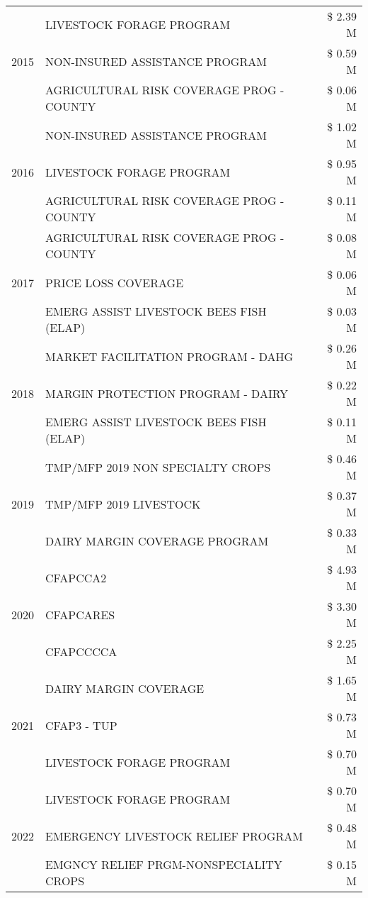 \begin{tabular}{llr}
\cline{1-3}
\multirow[t]{3}{*}{2015} & LIVESTOCK FORAGE PROGRAM & \$ 2.39 M \\
 & NON-INSURED ASSISTANCE PROGRAM & \$ 0.59 M \\
 & AGRICULTURAL RISK COVERAGE PROG - COUNTY & \$ 0.06 M \\
\cline{1-3}
\multirow[t]{3}{*}{2016} & NON-INSURED ASSISTANCE PROGRAM & \$ 1.02 M \\
 & LIVESTOCK FORAGE PROGRAM & \$ 0.95 M \\
 & AGRICULTURAL RISK COVERAGE PROG - COUNTY & \$ 0.11 M \\
\cline{1-3}
\multirow[t]{3}{*}{2017} & AGRICULTURAL RISK COVERAGE PROG - COUNTY & \$ 0.08 M \\
 & PRICE LOSS COVERAGE & \$ 0.06 M \\
 & EMERG ASSIST LIVESTOCK BEES FISH (ELAP) & \$ 0.03 M \\
\cline{1-3}
\multirow[t]{3}{*}{2018} & MARKET FACILITATION PROGRAM - DAHG & \$ 0.26 M \\
 & MARGIN PROTECTION PROGRAM - DAIRY & \$ 0.22 M \\
 & EMERG ASSIST LIVESTOCK BEES FISH (ELAP) & \$ 0.11 M \\
\cline{1-3}
\multirow[t]{3}{*}{2019} & TMP/MFP 2019 NON SPECIALTY CROPS & \$ 0.46 M \\
 & TMP/MFP 2019 LIVESTOCK & \$ 0.37 M \\
 & DAIRY MARGIN COVERAGE PROGRAM & \$ 0.33 M \\
\cline{1-3}
\multirow[t]{3}{*}{2020} & CFAPCCA2 & \$ 4.93 M \\
 & CFAPCARES & \$ 3.30 M \\
 & CFAPCCCCA & \$ 2.25 M \\
\cline{1-3}
\multirow[t]{3}{*}{2021} & DAIRY MARGIN COVERAGE & \$ 1.65 M \\
 & CFAP3 - TUP & \$ 0.73 M \\
 & LIVESTOCK FORAGE PROGRAM & \$ 0.70 M \\
\cline{1-3}
\multirow[t]{3}{*}{2022} & LIVESTOCK FORAGE PROGRAM & \$ 0.70 M \\
 & EMERGENCY LIVESTOCK RELIEF PROGRAM & \$ 0.48 M \\
 & EMGNCY RELIEF PRGM-NONSPECIALITY CROPS & \$ 0.15 M \\
\cline{1-3}
\bottomrule
\end{tabular}
